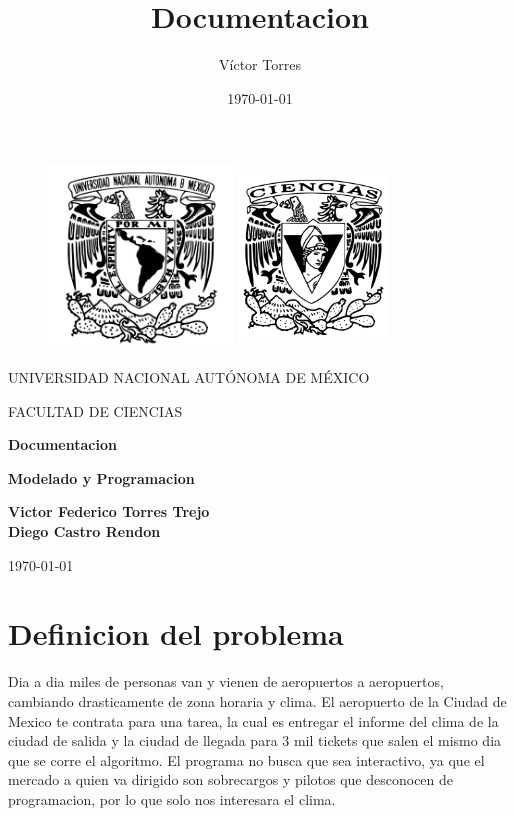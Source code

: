 \documentclass[12pt]{article}
\author{Víctor Torres}
\date{\today}
\title{Documentacion}
\begin{document}
\thispagestyle{empty}
\begin{figure}[h!]
  \includegraphics[height = 4.9cm ]{figures/Logo_UNAM.png}
  \label{EscudoUNAM}
  \endminipage
  \includegraphics[height = 4.9cm ,width=4cm]{figures/Logo_FC.png}
  \label{EscudoCiencias}
  \endminipage
\end{figure}

\begin{center}
  \vspace{1cm}
  \LARGE
  UNIVERSIDAD NACIONAL AUTÓNOMA DE MÉXICO
  
  \vspace{1cm}
  \LARGE
  FACULTAD DE CIENCIAS
  
  \vspace{1.5cm}	
  \Large
  \textbf{Documentacion}
  
  \vspace{1.5cm}
  \large
  \textbf{Modelado y Programacion}
  
  \vspace{1.5cm}
  \large
  \textbf{Victor Federico Torres Trejo\\Diego Castro Rendon}
  
  \vspace{1cm}
  \today
\end{center}
\tableofcontents
\newpage
\section{Definicion del problema}
Dia a dia miles de personas van y vienen de aeropuertos a aeropuertos, cambiando drasticamente de zona horaria y clima. El aeropuerto de la Ciudad de Mexico te contrata para una tarea, la cual es entregar el informe del clima de la ciudad de salida y la ciudad de llegada para 3 mil tickets que salen el mismo dia que se corre el algoritmo.
El programa no busca que sea interactivo, ya que el mercado a quien va dirigido son sobrecargos y pilotos que desconocen de programacion, por lo que solo nos interesara el clima.
\end{document}
